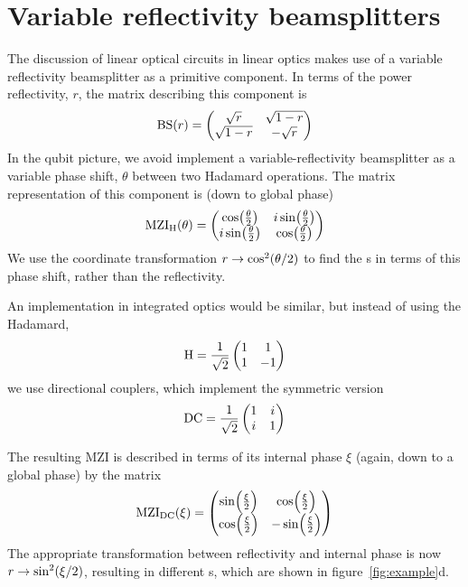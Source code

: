 \section{Variable reflectivity beamsplitters}
\label{sec:integrated}
The discussion of linear optical circuits in linear optics makes use of a
variable reflectivity beamsplitter as a primitive component. In terms of the
power reflectivity, \(r\), the matrix describing this component is
\begin{equation}
  \mathrm{BS} \!\left(r\right) = \begin{pmatrix}
    \sqrt{r} & \sqrt{1-r} \\
    \sqrt{1-r} & -\sqrt{r}
  \end{pmatrix}
\end{equation}
In the qubit picture, we avoid implement a variable-reflectivity beamsplitter as
a variable phase shift, \(\theta\) between two Hadamard operations. The matrix
representation of this component is (down to global phase)
\begin{equation}
  \mathrm{MZI}_{\mathrm{H}} \!\left(\theta\right) = \begin{pmatrix}
    \cos \!\left( \frac{\theta}{2} \right) & i \sin \!\left( \frac{\theta}{2} \right) \\
    i \sin \!\left( \frac{\theta}{2} \right) & \cos \!\left( \frac{\theta}{2} \right)
  \end{pmatrix}
\end{equation}
We use the coordinate transformation \( r \rightarrow \cos^{2} \!\left( \theta/2\right)
\) to find the \pdf{}s in terms of this phase shift, rather than the
reflectivity.

An implementation in integrated optics would be similar, but instead of using
the Hadamard,
\begin{equation}
  \mathrm{H} = \frac{1}{\sqrt{2}} \begin{pmatrix}
    1 & 1 \\
    1 & -1
  \end{pmatrix}
\end{equation}
we use directional couplers, which implement the symmetric version
\begin{equation}
  \mathrm{DC} = \frac{1}{\sqrt{2}} \begin{pmatrix}
    1 & i \\
    i & 1
  \end{pmatrix}
\end{equation}

The resulting MZI is described in terms of its internal phase \(\xi\) (again,
down to a global phase) by the matrix
\begin{equation}
  \mathrm{MZI}_{\mathrm{DC}} \!\left(\xi\right) = \begin{pmatrix}
    \sin \!\left( \frac{\xi}{2} \right) & \cos \!\left( \frac{\xi}{2} \right) \\
    \cos \!\left( \frac{\xi}{2} \right) & -\sin \!\left( \frac{\xi}{2} \right)
  \end{pmatrix}
\end{equation}
The appropriate transformation between reflectivity and internal phase is now
\(r \rightarrow \sin^{2} \!\left(\xi/2\right) \), resulting in different \pdf{}s, which
are shown in figure~\ref{fig:example}d.

